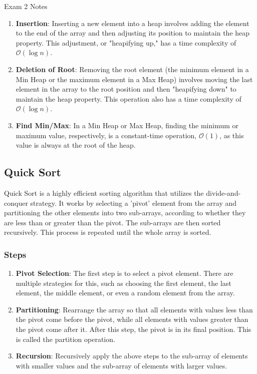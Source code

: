 \begin{examnotes}{Exam 2 Notes}
    \begin{enumerate}
        \item \textbf{Insertion}: Inserting a new element into a heap involves adding the element to the end of the array and then adjusting its position to maintain the heap property. This adjustment, 
        or "heapifying up," has a time complexity of $\mathcal{O}(\log n)$.
        \item \textbf{Deletion of Root}: Removing the root element (the minimum element in a Min Heap or the maximum element in a Max Heap) involves moving the last element in the array to the root 
        position and then "heapifying down" to maintain the heap property. This operation also has a time complexity of $\mathcal{O}(\log n)$.
        \item \textbf{Find Min/Max}: In a Min Heap or Max Heap, finding the minimum or maximum value, respectively, is a constant-time operation, $\mathcal{O}(1)$, as this value is always at the root 
        of the heap.
    \end{enumerate}

    \subsection*{Quick Sort}

    Quick Sort is a highly efficient sorting algorithm that utilizes the divide-and-conquer strategy. It works by selecting a 'pivot' element from the array and partitioning the other elements into 
    two sub-arrays, according to whether they are less than or greater than the pivot. The sub-arrays are then sorted recursively. This process is repeated until the whole array is sorted.

    \subsubsection*{Steps}

    \begin{enumerate}
        \item \textbf{Pivot Selection}: The first step is to select a pivot element. There are multiple strategies for this, such as choosing the first element, the last element, the middle element, 
        or even a random element from the array.
        \item \textbf{Partitioning}: Rearrange the array so that all elements with values less than the pivot come before the pivot, while all elements with values greater than the pivot come after 
        it. After this step, the pivot is in its final position. This is called the partition operation.
        \item \textbf{Recursion}: Recursively apply the above steps to the sub-array of elements with smaller values and the sub-array of elements with larger values.
    \end{enumerate}


\end{examnotes}

